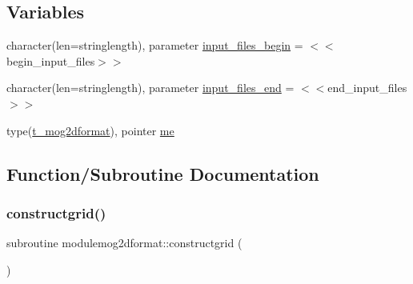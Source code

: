 \subsection*{Variables}
\begin{DoxyCompactItemize}
\item 
character(len=stringlength), parameter \mbox{\hyperlink{namespacemodulemog2dformat_a9153156b80854bc74809b654b88cde04}{input\+\_\+files\+\_\+begin}} = \textquotesingle{}$<$$<$begin\+\_\+input\+\_\+files$>$$>$\textquotesingle{}
\item 
character(len=stringlength), parameter \mbox{\hyperlink{namespacemodulemog2dformat_ad52b244ec5767f8c93a8186934533613}{input\+\_\+files\+\_\+end}} = \textquotesingle{}$<$$<$end\+\_\+input\+\_\+files$>$$>$\textquotesingle{}
\item 
type(\mbox{\hyperlink{structmodulemog2dformat_1_1t__mog2dformat}{t\+\_\+mog2dformat}}), pointer \mbox{\hyperlink{namespacemodulemog2dformat_a5a01bc4ba0aea55aa0198799d344547a}{me}}
\end{DoxyCompactItemize}


\subsection{Function/\+Subroutine Documentation}
\mbox{\label{namespacemodulemog2dformat_aec84c860ca2bbc962dda260595025f58}} 
\subsubsection{\texorpdfstring{constructgrid()}{constructgrid()}}
{\footnotesize\ttfamily subroutine modulemog2dformat\+::constructgrid (\begin{DoxyParamCaption}{ }\end{DoxyParamCaption})\hspace{0.3cm}{\ttfamily [private]}}

